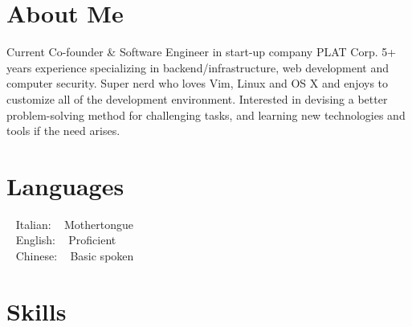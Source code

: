 \documentclass[letterpaper]{soragna-onepage-twocols} %
\begin{document}
\begin{minipage}[t]{0.3\textwidth} %


\section{About Me  \aboutmeicon} 


Current Co-founder \& Software Engineer in start-up company PLAT Corp. 5+ years experience specializing in backend/infrastructure, web development and computer security. Super nerd who loves Vim, Linux and OS X and enjoys to customize all of the development environment. Interested in devising a better problem-solving method for challenging tasks, and learning new technologies and tools if the need arises.


\sectionspace %


\section{Languages \languagesicon} 


 ~ {Italian}: ~ Mothertongue\\
 ~ {English}: ~ Proficient\\
 ~ {Chinese:} ~ Basic spoken


\sectionspace %



\section{Skills \technicalskillsicon }


\end{minipage}
\end{document}
